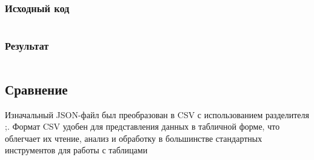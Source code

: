 \subsubsection{Исходный код}
\inputminted[breaklines]{python}{../task_6.py}

\subsubsection{Результат}
\inputminted[breaklines]{text}{../schedule.csv}

\subsection{Сравнение}
Изначальный JSON-файл был преобразован в CSV с использованием разделителя ;. Формат CSV удобен для представления данных в табличной форме, что облегчает их чтение, анализ и обработку в большинстве стандартных инструментов для работы с таблицами